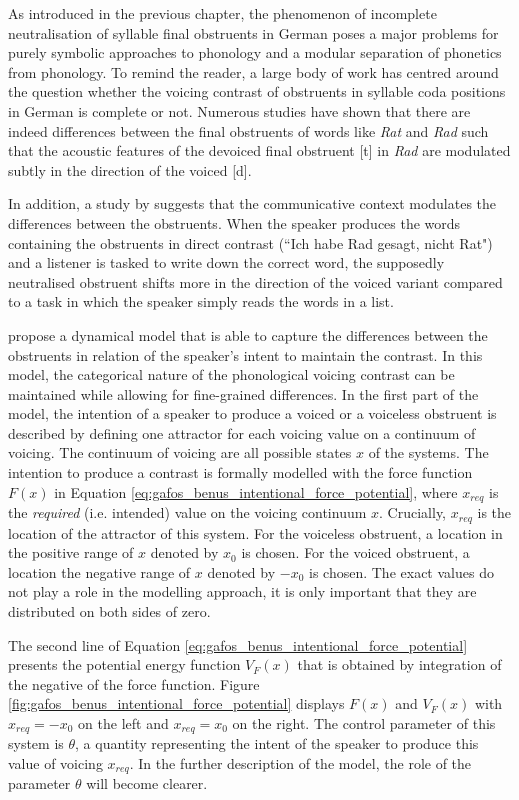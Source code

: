 As introduced in the previous chapter, the phenomenon of incomplete neutralisation of syllable final obstruents in German poses a major problems for purely symbolic approaches to phonology and a modular separation of phonetics from phonology. To remind the reader, a large body of work has centred around the question whether the voicing contrast of obstruents in syllable coda positions in German is complete or not. Numerous studies have shown that there are indeed differences between the final obstruents of words like \emph{Rat} and \emph{Rad} such that the acoustic features of the devoiced final obstruent [t] in \emph{Rad} are modulated subtly in the direction of the voiced [d].

In addition, a study by \citet{PortCrawford1989} suggests that the communicative context modulates the differences between the obstruents. When the speaker produces the words containing the obstruents in direct contrast (``Ich habe Rad gesagt, nicht Rat") and a listener is tasked to write down the correct word, the supposedly neutralised obstruent shifts more in the direction of the voiced variant compared to a task in which the speaker simply reads the words in a list.

\citet{GafosBenus2006} propose a dynamical model that is able to capture the differences between the obstruents in relation of the speaker's intent to maintain the contrast. In this model, the categorical nature of the phonological voicing contrast can be maintained while allowing for fine-grained differences. In the first part of the model, the intention of a speaker to produce a voiced or a voiceless obstruent is described by defining one attractor for each voicing value on a continuum of voicing. The continuum of voicing are all possible states $x$ of the systems. The intention to produce a contrast is formally modelled with the force function $F(x)$ in Equation \ref{eq:gafos_benus_intentional_force_potential}, where $x_{req}$ is the \emph{required} (i.e. intended) value on the voicing continuum $x$. Crucially, $x_{req}$ is the location of the attractor of this system. For the voiceless obstruent, a location in the positive range of $x$ denoted by $x_0$ is chosen. For the voiced obstruent, a location the negative range of $x$ denoted by $-x_0$ is chosen. The exact values do not play a role in the modelling approach, it is only important that they are distributed on both sides of zero.

The second line of Equation \ref{eq:gafos_benus_intentional_force_potential} presents the potential energy function $V_F(x)$ that is obtained by integration of the negative of the force function. Figure \ref{fig:gafos_benus_intentional_force_potential} displays $F(x)$ and $V_F(x)$ with $x_{req} = -x_0$ on the left and $x_{req} = x_0$ on the right. The control parameter of this system is $\theta$, a quantity representing the intent of the speaker to produce this value of voicing $x_{req}$. In the further description of the model, the role of the parameter $\theta$ will become clearer.

